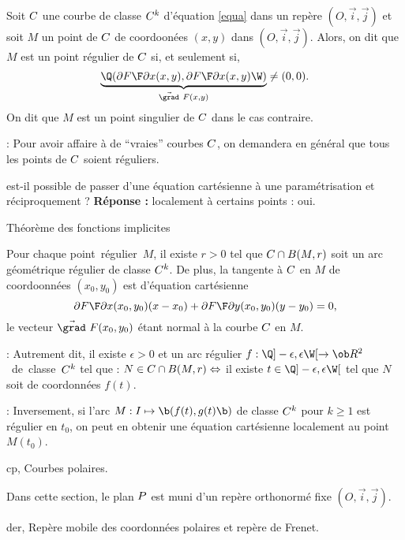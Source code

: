 \Definition Soit $\sc C$ une courbe de classe $\sc C^k$ d'équation \eqref{equa} 
dans un repère $(O,\vec i,\vec j)$ et soit $M$ un point de $\sc C$ 
de coordoonées $(x,y)$ dans $(O,\vec i,\vec j)$. Alors, on dit que $M$ 
est un point régulier de $\sc C$ si, et seulement si, 
$$
\underbrace{\Q({\partial F\F\partial x}(x,y),{\partial F\F\partial x}(x,y)\W)}_{\vec{\grad}\ F(x,y)}\neq(0,0).
$$ 
On dit que $M$ est un point singulier de $\sc C$ dans le cas contraire. 
\bigskip

\Remarque : Pour avoir affaire à de ``vraies'' courbes $\sc C$, on demandera en général 
que tous les points de $\sc C$ soient réguliers. 
\bigskip

est-il possible de passer d'une équation cartésienne 
à une paramétrisation et réciproquement ? {\bf Réponse :}
localement à certains points : oui. 
\medskip

\Concept Théorème des fonctions implicites

\Theoreme [$(O,\vec i,\vec j)$ repère de $\sc P$, $k\in\overline{\ob N}^*$ et 
$\sc C$ courbe de classe $\sc C^k$ d'équation cartésienne ${F(x,y)=0}$ dans $\sc P$] 
Pour chaque point~régulier~$M$, il existe $r>0$ tel que $\sc C\cap B(M,r)$ 
soit un arc géométrique régulier de classe $\sc C^k$. 
\medskip\noindent
De plus, la tangente à $\sc C$ en $M$ de coordoonnées $(x_0,y_0)$ est d'équation cartésienne 
$$
{\partial F\F\partial x}(x_0,y_0)(x-x_0)+{\partial F\F\partial y}(x_0,y_0)(y-y_0)=0,
$$
le vecteur $\vec{\grad}\ F(x_0,y_0)$ étant normal à la courbe $\sc C$ en $M$.
\bigskip

\Remarque : Autrement dit, il existe $\epsilon>0$ 
et un arc régulier $f:\Q]-\epsilon,\epsilon\W[\to\ob R^2$~de~classe~$\sc C^k$ 
tel que : $N\in \sc C\cap B(M,r)\Leftrightarrow $ il existe $t\in\Q]-\epsilon,\epsilon\W[$ 
tel que $N$ soit de coordonnées $f(t)$. 
\bigskip

\Remarque : Inversement, si l'arc $M:I\mapsto\b(f(t),g(t)\b)$ de classe $\sc C^k$ pour $k\ge1$ 
est régulier en $t_0$, on peut en obtenir une équation cartésienne localement 
au point $M(t_0)$. 
\bigskip



\Section cp, Courbes polaires. 
\bigskip

\noindent
Dans cette section, le plan $\sc P$ est muni d'un repère orthonormé fixe
$(O,\vec i,\vec j)$. 
\bigskip

\Subsection der, Repère mobile des coordonnées polaires et repère de Frenet. 
\bigskip

